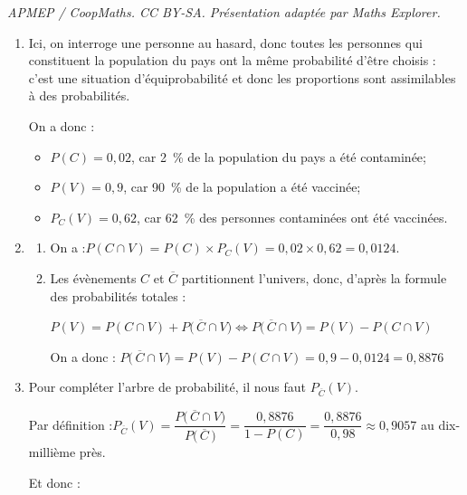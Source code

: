 \documentclass[10pt]{article}
\providecommand{\np}[2][]{{#2~#1}}
\begin{document}
\noindent\textit{APMEP / CoopMaths. CC BY-SA. Présentation adaptée par Maths Explorer.}\par\medskip
\medskip

\begin{enumerate}
\item Ici, on interroge une personne au hasard, donc toutes les personnes qui constituent la population du pays ont la même probabilité d'être choisis : c'est une situation d'équiprobabilité et donc les proportions sont assimilables à des probabilités.

On a donc :
\begin{itemize}
\item $P(C) = 0,02$, car 2~\% de la population du pays a été contaminée;
\item $P(V) = 0,9$, car 90~\% de la population a été vaccinée;
\item $P_C(V) = 0,62$, car 62~\% des personnes contaminées ont été vaccinées.
\end{itemize}

\item 
	\begin{enumerate}
		\item On a :\quad $P(C \cap V) = P(C) \times P_C(V) = 0,02 \times 0,62 = 0,0124$.
		\item Les évènements $C$ et $\overline{C}$ partitionnent l'univers, donc, d'après la formule des probabilités totales :

$P(V) = P(C \cap V) + P\big(\,\overline{C}\cap V\big) \iff P\big(\,\overline{C} \cap V\big) = P(V) -
 P(C \cap V)$

On a donc : \quad $P\big(\,\overline{C} \cap V\big) = P(V) - P(C \cap V) = 0,9 - 0,0124 = \np{0,8876}$
	\end{enumerate}
\item Pour compléter l'arbre de probabilité, il nous faut $P_{\overline{C}}(V)$.

Par définition :\quad $P_{\overline{C}}(V) = \dfrac{P\big(\,\overline{C} \cap V\big)}{P\big(\,\overline{C}\,\big)} = \dfrac{0,8876}{1 - P(C)}=\dfrac{0,8876}{0,98} \approx 0,9057$ au dix-millième près.

Et donc : \hfill~
\end{enumerate}
\end{document}
